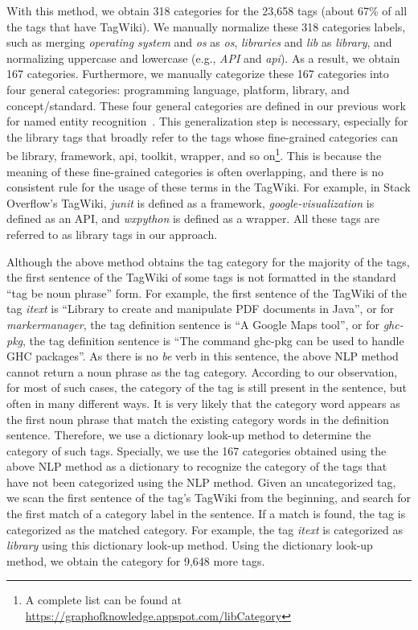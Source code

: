 With this method, we obtain 318 categories for the 23,658 tags (about 67\% of all the tags that have TagWiki).
We manually normalize these 318 categories labels, such as merging \textit{operating system} and \textit{os} as \textit{os}, \textit{libraries} and \textit{lib} as \textit{library}, and normalizing uppercase and lowercase (e.g., \textit{API} and \textit{api}).
As a result, we obtain 167 categories.
Furthermore, we manually categorize these 167 categories into four general categories: programming language, platform, library, and concept/standard.
These four general categories are defined in our previous work for named entity recognition~\cite{ye2016software}.
This generalization step is necessary, especially for the library tags that broadly refer to the tags whose fine-grained categories can be library, framework, api, toolkit, wrapper, and so on\footnote{A complete list can be found at \url{https://graphofknowledge.appspot.com/libCategory}}.
This is because the meaning of these fine-grained categories is often overlapping, and there is no consistent rule for the usage of these terms in the TagWiki.
For example, in Stack Overflow’s TagWiki, \textit{junit} is defined as a framework, \textit{google-visualization} is defined as an API, and \textit{wxpython} is defined as a wrapper. All these tags are referred to as library tags in our approach.


Although the above method obtains the tag category for the majority of the tags, the first sentence of the TagWiki of some tags is not formatted in the standard ``tag be noun phrase'' form.
For example, the first sentence of the TagWiki of the tag \textit{itext} is ``Library to create and manipulate PDF documents in Java'', or for \textit{markermanager}, the tag definition sentence is ``A Google Maps tool'', or for \textit{ghc-pkg}, the tag definition sentence is ``The command ghc-pkg can be used to handle GHC packages''.
As there is no \textit{be} verb in this sentence, the above NLP method cannot return a noun phrase as the tag category.
According to our observation, for most of such cases, the category of the tag is still present in the sentence, but often in many different ways.
It is very likely that the category word appears as the first noun phrase that match the existing category words in the definition sentence.
Therefore, we use a dictionary look-up method to determine the category of such tags.
Specially, we use the 167 categories obtained using the above NLP method as a dictionary to recognize the category of the tags that have not been categorized using the NLP method.
Given an uncategorized tag, we scan the first sentence of the tag's TagWiki from the beginning, and search for the first match of a category label in the sentence.
If a match is found, the tag is categorized as the matched category.
For example, the tag \textit{itext} is categorized as \textit{library} using this dictionary look-up method.
Using the dictionary look-up method, we obtain the category for 9,648 more tags.


